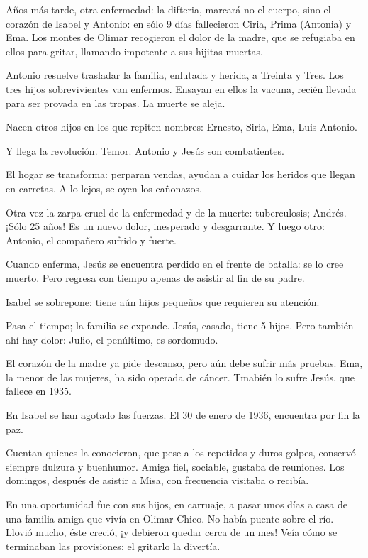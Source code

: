 \documentclass[a4paper]{article}
\begin{document}
Años más tarde, otra enfermedad: la difteria, marcará no el cuerpo, sino el corazón de Isabel y Antonio: en sólo 9 días fallecieron Ciria, Prima (Antonia) y Ema. Los montes de Olimar recogieron el dolor de la madre, que se refugiaba en ellos para gritar, llamando impotente a sus hijitas muertas.

Antonio resuelve trasladar la familia, enlutada y herida, a Treinta y Tres. Los tres hijos sobrevivientes van enfermos. Ensayan en ellos la vacuna, recién llevada para ser provada en las tropas. La muerte se aleja.

Nacen otros hijos en los que repiten nombres: Ernesto, Siria, Ema, Luis Antonio.

Y llega la revolución. Temor. Antonio y Jesús son combatientes.

El hogar se transforma: perparan vendas, ayudan a cuidar los heridos que llegan en carretas. A lo lejos, se oyen los cañonazos.

Otra vez la zarpa cruel de la enfermedad y de la muerte: tuberculosis; Andrés. ¡Sólo 25 años! Es un nuevo dolor, inesperado y desgarrante. Y luego otro: Antonio, el compañero sufrido y fuerte.

Cuando enferma, Jesús se encuentra perdido en el frente de batalla: se lo cree muerto. Pero regresa con tiempo apenas de asistir al fin de su padre.

Isabel se sobrepone: tiene aún hijos pequeños que requieren su atención.

Pasa el tiempo; la familia se expande. Jesús, casado, tiene 5 hijos. Pero también ahí hay dolor: Julio, el penúltimo, es sordomudo.

El corazón de la madre ya pide descanso, pero aún debe sufrir más pruebas. Ema, la menor de las mujeres, ha sido operada de cáncer. Tmabién lo sufre Jesús, que fallece en 1935.

En Isabel se han agotado las fuerzas. El 30 de enero de 1936, encuentra por fin la paz.

Cuentan quienes la conocieron, que pese a los repetidos y duros golpes, conservó siempre dulzura y buenhumor. Amiga fiel, sociable, gustaba de reuniones. Los domingos, después de asistir a Misa, con frecuencia visitaba o recibía.

En una oportunidad fue con sus hijos, en carruaje, a pasar unos días a casa de una familia amiga que vivía en Olimar Chico. No había puente sobre el río. Llovió mucho, éste creció, ¡y debieron quedar cerca de un mes! Veía cómo se terminaban las provisiones; el gritarlo la divertía.
\end{document}
